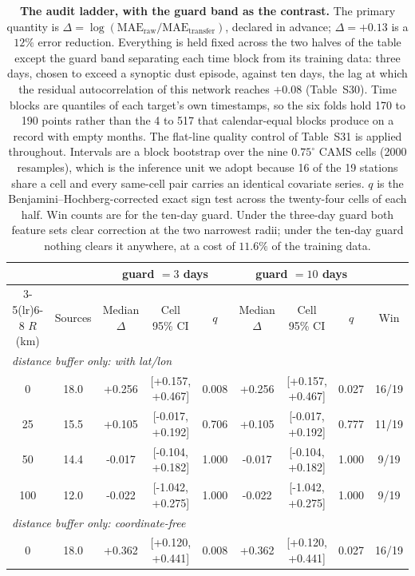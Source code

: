 \documentclass[11pt]{article}
\begin{document}
\begin{table}[htbp]\centering\footnotesize
\caption{\textbf{The audit ladder, with the guard band as the contrast.} The primary
quantity is $\Delta=\log(\mathrm{MAE_{raw}}/\mathrm{MAE_{transfer}})$, declared in advance;
$\Delta=+0.13$ is a $12\%$ error reduction. Everything is held fixed across the two halves
of the table except the guard band separating each time block from its training data:
three days, chosen to exceed a synoptic dust episode, against ten days, the lag at which
the residual autocorrelation of this network reaches $+0.08$ (Table~S30). Time blocks are
quantiles of each target's own timestamps, so the six folds hold 170 to 190 points rather
than the 4 to 517 that calendar-equal blocks produce on a record with empty months. The
flat-line quality control of Table~S31 is applied throughout. Intervals are a block
bootstrap over the nine $0.75^\circ$ CAMS cells (2000 resamples), which is the inference
unit we adopt because 16 of the 19 stations share a cell and every same-cell pair carries
an identical covariate series. $q$ is the Benjamini--Hochberg-corrected exact sign test
across the twenty-four cells of each half. Win counts are for the ten-day guard. Under the
three-day guard both feature sets clear correction at the two narrowest radii; under the
ten-day guard nothing clears it anywhere, at a cost of $11.6\%$ of the training data.}
\begin{tabular}{ccccccccc}\toprule
& & \multicolumn{3}{c}{guard $=3$ days} & \multicolumn{3}{c}{guard $=10$ days} & \\
\cmidrule(lr){3-5}\cmidrule(lr){6-8}
$R$ (km) & Sources & Median $\Delta$ & Cell 95\% CI & $q$ & Median $\Delta$ & Cell 95\% CI & $q$ & Win \\ \midrule
\multicolumn{9}{l}{\textit{distance buffer only: with lat/lon}} \\
0 & 18.0 & +0.256 & [+0.157, +0.467] & 0.008 & +0.256 & [+0.157, +0.467] & 0.027 & 16/19 \\
25 & 15.5 & +0.105 & [-0.017, +0.192] & 0.706 & +0.105 & [-0.017, +0.192] & 0.777 & 11/19 \\
50 & 14.4 & -0.017 & [-0.104, +0.182] & 1.000 & -0.017 & [-0.104, +0.182] & 1.000 & 9/19 \\
100 & 12.0 & -0.022 & [-1.042, +0.275] & 1.000 & -0.022 & [-1.042, +0.275] & 1.000 & 9/19 \\
\multicolumn{9}{l}{\textit{distance buffer only: coordinate-free}} \\
0 & 18.0 & +0.362 & [+0.120, +0.441] & 0.008 & +0.362 & [+0.120, +0.441] & 0.027 & 16/19 \\

\end{tabular}
\end{table}
\end{document}
